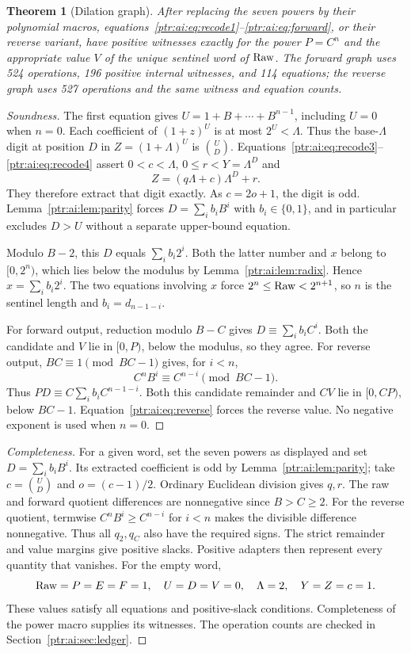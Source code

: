 \documentclass[11pt,letterpaper]{article}
\newtheorem{theorem}{Theorem}[section]
\theoremstyle{definition}\newtheorem{definition}[theorem]{Definition}
\theoremstyle{remark}\newtheorem{remark}[theorem]{Remark}
\begin{document}
\begin{theorem}[Dilation graph]\label{ptr:ai:thm:dilation}
After replacing the seven powers by their polynomial macros, equations~\eqref{ptr:ai:eq:recode1}--\eqref{ptr:ai:eq:forward}, or their reverse variant, have positive witnesses exactly for the power $P=C^n$ and the appropriate value $V$ of the unique sentinel word of $\mathrm{Raw}$. The forward graph uses 524 operations, 196 positive internal witnesses, and 114 equations; the reverse graph uses 527 operations and the same witness and equation counts.
\end{theorem}
\begin{proof}[Soundness]
The first equation gives $U=1+B+\cdots+B^{n-1}$, including $U=0$ when $n=0$. Each coefficient of $(1+z)^U$ is at most $2^U<\Lambda$. Thus the base-$\Lambda$ digit at position $D$ in $Z=(1+\Lambda)^U$ is $\binom UD$. Equations~\eqref{ptr:ai:eq:recode3}--\eqref{ptr:ai:eq:recode4} assert $0<c<\Lambda$, $0\le r<Y=\Lambda^D$ and
\[
 Z=(q\Lambda+c)\Lambda^D+r.
\]
They therefore extract that digit exactly. As $c=2o+1$, the digit is odd. Lemma~\ref{ptr:ai:lem:parity} forces $D=\sum_i b_iB^i$ with $b_i\in\{0,1\}$, and in particular excludes $D>U$ without a separate upper-bound equation.

Modulo $B-2$, this $D$ equals $\sum_i b_i2^i$. Both the latter number and $x$ belong to $[0,2^n)$, which lies below the modulus by Lemma~\ref{ptr:ai:lem:radix}. Hence $x=\sum_i b_i2^i$. The two equations involving $x$ force $2^n\le\mathrm{Raw}<2^{n+1}$, so $n$ is the sentinel length and $b_i=d_{n-1-i}$.

For forward output, reduction modulo $B-C$ gives $D\equiv\sum_i b_iC^i$. Both the candidate and $V$ lie in $[0,P)$, below the modulus, so they agree. For reverse output, $BC\equiv1\pmod{BC-1}$ gives, for $i<n$,
\[
 C^nB^i\equiv C^{n-i}\pmod{BC-1}.
\]
Thus $PD\equiv C\sum_i b_iC^{n-1-i}$. Both this candidate remainder and $CV$ lie in $[0,CP)$, below $BC-1$. Equation~\eqref{ptr:ai:eq:reverse} forces the reverse value. No negative exponent is used when $n=0$.
\end{proof}
\begin{proof}[Completeness]
For a given word, set the seven powers as displayed and set $D=\sum_i b_iB^i$. Its extracted coefficient is odd by Lemma~\ref{ptr:ai:lem:parity}; take $c=\binom UD$ and $o=(c-1)/2$. Ordinary Euclidean division gives $q,r$. The raw and forward quotient differences are nonnegative since $B>C\ge2$. For the reverse quotient, termwise $C^nB^i\ge C^{n-i}$ for $i<n$ makes the divisible difference nonnegative. Thus all $q_2,q_C$ also have the required signs. The strict remainder and value margins give positive slacks. Positive adapters then represent every quantity that vanishes. For the empty word,
\[
 \mathrm{Raw}=P=E=F=1,\quad U=D=V=0,\quad
 \Lambda=2,\quad Y=Z=c=1.
\]
These values satisfy all equations and positive-slack conditions. Completeness of the power macro supplies its witnesses. The operation counts are checked in Section~\ref{ptr:ai:sec:ledger}.
\end{proof}
\end{document}
